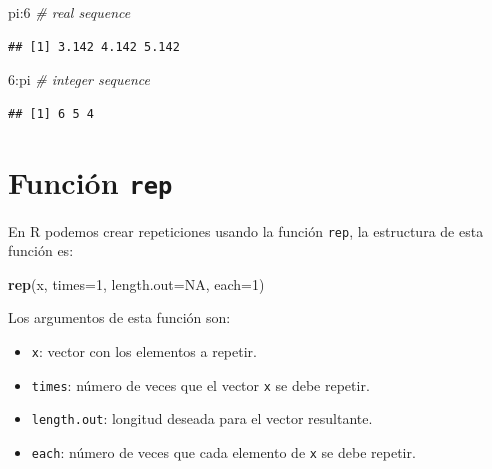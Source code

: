 \documentclass[10pt,]{krantz}
\makeatletter
\newenvironment{Shaded}{\begin{snugshade}}{\end{snugshade}}
\newcommand{\KeywordTok}[1]{\textcolor[rgb]{0.13,0.29,0.53}{\textbf{{#1}}}}
\newcommand{\DataTypeTok}[1]{\textcolor[rgb]{0.13,0.29,0.53}{{#1}}}
\newcommand{\DecValTok}[1]{\textcolor[rgb]{0.00,0.00,0.81}{{#1}}}
\newcommand{\CommentTok}[1]{\textcolor[rgb]{0.56,0.35,0.01}{\textit{{#1}}}}
\newcommand{\OtherTok}[1]{\textcolor[rgb]{0.56,0.35,0.01}{{#1}}}
\newcommand{\NormalTok}[1]{{#1}}
\providecommand{\tightlist}{%
  \setlength{\itemsep}{0pt}\setlength{\parskip}{0pt}}
\let\proglang=\textsf
\newenvironment{kframe}{%
\medskip{}
\setlength{\fboxsep}{.8em}
 \def\at@end@of@kframe{}%
 \ifinner\ifhmode%
  \def\at@end@of@kframe{\end{minipage}}%
  \begin{minipage}{\columnwidth}%
 \fi\fi%
 \def\FrameCommand##1{\hskip\@totalleftmargin \hskip-\fboxsep
 \colorbox{shadecolor}{##1}\hskip-\fboxsep
     \hskip-\linewidth \hskip-\@totalleftmargin \hskip\columnwidth}%
 \MakeFramed {\advance\hsize-\width
   \@totalleftmargin\z@ \linewidth\hsize
   \@setminipage}}%
 {\par\unskip\endMakeFramed%
 \at@end@of@kframe}
\renewenvironment{Shaded}{\begin{kframe}}{\end{kframe}}
\makeatother
\begin{document}
\begin{Shaded}
\begin{Highlighting}[]
\NormalTok{pi:}\DecValTok{6}  \CommentTok{# real sequence}
\end{Highlighting}
\end{Shaded}

\begin{verbatim}
## [1] 3.142 4.142 5.142
\end{verbatim}

\begin{Shaded}
\begin{Highlighting}[]
\DecValTok{6}\NormalTok{:pi  }\CommentTok{# integer sequence}
\end{Highlighting}
\end{Shaded}

\begin{verbatim}
## [1] 6 5 4
\end{verbatim}

\section{\texorpdfstring{Función \texttt{rep} 
}{Función rep  }}\label{funcion-rep}

En \proglang{R} podemos crear repeticiones usando la función
\texttt{rep}, la estructura de esta función es:

\begin{Shaded}
\begin{Highlighting}[]
\KeywordTok{rep}\NormalTok{(x, }\DataTypeTok{times=}\DecValTok{1}\NormalTok{, }\DataTypeTok{length.out=}\OtherTok{NA}\NormalTok{, }\DataTypeTok{each=}\DecValTok{1}\NormalTok{)}
\end{Highlighting}
\end{Shaded}

Los argumentos de esta función son:

\begin{itemize}
\tightlist
\item
  \texttt{x}: vector con los elementos a repetir.
\item
  \texttt{times}: número de veces que el vector \texttt{x} se debe
  repetir.
\item
  \texttt{length.out}: longitud deseada para el vector resultante.
\item
  \texttt{each}: número de veces que cada elemento de \texttt{x} se debe
  repetir.
\end{itemize}
\end{document}
